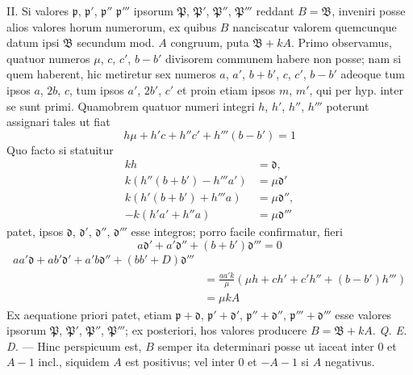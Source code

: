 II. Si valores $\mathfrak{p}$, $\mathfrak{p}'$, $\mathfrak{p}''$ $\mathfrak{p}'''$ ipsorum $\mathfrak{P}$, $\mathfrak{P}'$, $\mathfrak{P}''$, $\mathfrak{P}'''$ reddant $B=\mathfrak{B}$, inveniri posse alios valores horum numerorum, ex quibus $B$ nanciscatur valorem quemcunque datum ipsi $\mathfrak{B}$ secundum mod. $A$ congruum, puta $\mathfrak{B}+kA$. Primo observamus, quatuor numeros $\mu$, $c$, $c'$, $b-b'$ divisorem communem habere non posse; nam si quem haberent, hic metiretur sex numeros $a$, $a'$, $b+b'$, $c$, $c'$, $b-b'$ adeoque tum ipsos $a$, $2b$, $c$, tum ipsos $a'$, $2b'$, $c'$ et proin etiam ipsos $m$, $m'$, qui per hyp. inter se sunt primi. Quamobrem quatuor numeri integri $h$, $h'$, $h''$, $h'''$ poterunt assignari tales ut fiat
\[
h\mu+h'c+h''c'+h'''(b-b')=1
\]
Quo facto si statuitur
\[
\begin{aligned}
kh&=\mathfrak{d},\\k(h''(b+b')-h'''a')&=\mu\mathfrak{d}'\\
k(h'(b+b')+h'''a)&=\mu\mathfrak{d}'',\\-k(h'a'+h''a)&=\mu\mathfrak{d}'''
\end{aligned}
\]
patet, ipsos $\mathfrak{d}$, $\mathfrak{d}'$, $\mathfrak{d}''$, $\mathfrak{d}'''$ esse integros; porro facile confirmatur, fieri
\[
a\mathfrak{d}'+a'\mathfrak{d}''+(b+b')\mathfrak{d}'''=0
\]
\[
\begin{aligned}aa'\mathfrak{d}+ab'\mathfrak{d}'+a'b\mathfrak{d}''+(bb'+D)\mathfrak{d}'''\\&=\frac{aa'k}{\mu}(\mu h+ch'+c'h''+(b-b')h''')\\&=\mu kA\end{aligned}
\]
Ex aequatione priori patet, etiam $\mathfrak{p}+\mathfrak{d}$, $\mathfrak{p}'+\mathfrak{d}'$, $\mathfrak{p}''+\mathfrak{d}''$, $\mathfrak{p}'''+\mathfrak{d}'''$ esse valores ipsorum $\mathfrak{P}$, $\mathfrak{P}'$, $\mathfrak{P}''$, $\mathfrak{P}'''$; ex posteriori, hos valores producere $B=\mathfrak{B}+kA$. \textit{Q. E. D.} ---
Hinc perspicuum est, $B$ semper ita determinari posse ut iaceat inter $0$ et $A-1$ incl., siquidem $A$ est positivus; vel inter $0$ et $-A-1$ si $A$ negativus.

